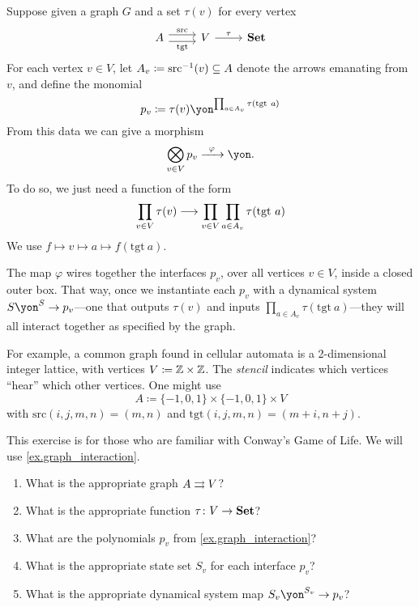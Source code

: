 \documentclass[Book-Poly]{subfiles}
\begin{document}
\begin{example}\label{ex.graph_interaction}
Suppose given a graph $G$ and a set $\tau(v)$ for every vertex
\[
\begin{tikzcd}
	A\ar[r, shift left=3pt, "\text{src}"]\ar[r, shift right=3pt, "\text{tgt}"']&
	V\ar[r, "\tau"]&
	\smset
\end{tikzcd}
\]
For each vertex $v\in V$, let $A_v\coloneqq\text{src}^{-1}(v)\subseteq A$ denote the arrows emanating from $v$, and define the monomial
\[
	p_v\coloneqq\tau(v)\yon^{\prod_{a\in A_v}\tau(\text{tgt}\ a)}
\]
From this data we can give a morphism
\[
\bigotimes_{v\in V}p_v\Too{\varphi}\yon.
\]
To do so, we just need a function of the form
\[
\prod_{v\in V}\tau(v)\longrightarrow\prod_{v\in V}\prod_{a\in A_v}\tau(\text{tgt}\ a)
\]
We use $f\mapsto v\mapsto a\mapsto f(\text{tgt}\ a)$.

The map $\varphi$ wires together the interfaces $p_v$, over all vertices $v\in V$, inside a closed outer box. That way, once we instantiate each $p_v$ with a dynamical system $S\yon^S\to p_v$---one that outputs $\tau(v)$ and inputs $\prod_{a\in A_v}\tau(\text{tgt}\ a)$---they will all interact together as specified by the graph.

For example, a common graph found in cellular automata is a 2-dimensional integer lattice, with vertices $V\coloneqq\mathbb{Z}\times\mathbb{Z}$. The \emph{stencil} indicates which vertices ``hear'' which other vertices. One might use
\[A\coloneqq\{-1,0,1\}\times\{-1,0,1\}\times V\]
with $\text{src}(i,j,m,n)=(m,n)$ and $\text{tgt}(i,j,m,n)=(m+i, n+j)$.
\end{example}

\begin{exercise}
This exercise is for those who are familiar with Conway's Game of Life. We will use \cref{ex.graph_interaction}.
\begin{enumerate}
	\item What is the appropriate graph $A\rightrightarrows V$?
	\item What is the appropriate function $\tau\colon V\to\textbf{Set}$?
	\item What are the polynomials $p_v$ from \cref{ex.graph_interaction}?
	\item What is the appropriate state set $S_v$ for each interface $p_v$?
	\item What is the appropriate dynamical system map $S_v\yon^{S_v}\to p_v$?
\qedhere
\end{enumerate}
\end{exercise}
\end{document}
